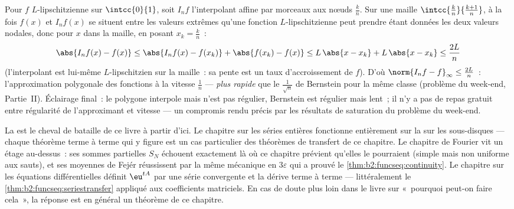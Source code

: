 \begin{example}\label{ex:b2:funcseq:polygonal}
Pour $f$ $L$-lipschitzienne sur $\intcc{0}{1}$, soit $I_nf$
l'interpolant affine par morceaux aux nœuds $\frac kn$. Sur une
maille $\intcc{\frac kn}{\frac{k+1}n}$, à la fois $f(x)$ et
$I_nf(x)$ se situent entre les valeurs extrêmes qu'une fonction
$L$-lipschitzienne peut prendre étant données les deux valeurs
nodales, donc pour $x$ dans la maille, en posant $x_k = \frac kn$~:
\[
\abs{I_nf(x) - f(x)}
\leq \abs{I_nf(x) - f(x_k)} + \abs{f(x_k) - f(x)}
\leq L\,\abs{x - x_k} + L\,\abs{x - x_k}
\leq \frac{2L}{n}
\]
(l'interpolant est lui-même $L$-lipschitzien sur la maille~: sa
pente est un taux d'accroissement de $f$). D'où $\norm{I_nf -
f}_\infty \leq \frac{2L}{n}$~: l'approximation polygonale des
fonctions   à la vitesse $\frac1n$ ---
\emph{plus rapide} que le $\frac{1}{\sqrt n}$ de Bernstein pour la
même classe (problème du week-end, Partie~II). Éclairage final~: le
polygone interpole mais n'est pas régulier, Bernstein est régulier
mais lent~; il n'y a pas de repas gratuit entre régularité de
l'approximant et vitesse --- un compromis rendu précis par les
résultats de saturation du problème du week-end.
\end{example}

\begin{remark}
La  est le cheval de bataille de ce livre à partir
d'ici. Le chapitre sur les séries entières fonctionne entièrement sur
la  sur les sous-disques  --- chaque
théorème terme à terme qui y figure est un cas particulier des
théorèmes de transfert de ce chapitre. Le chapitre de Fourier vit un
étage au-dessus~: ses sommes partielles $S_N$ échouent exactement là
où ce chapitre prévient qu'elles le pourraient (simple mais non
uniforme aux sauts), et ses moyennes de Fejér réussissent par la même
mécanique en $3\varepsilon$ qui a prouvé le
\cref{thm:b2:funcseq:continuity}. Le chapitre sur les équations
différentielles définit $\eu^{tA}$ par une série 
convergente et la dérive terme à terme --- littéralement le
\cref{thm:b2:funcseq:seriestransfer} appliqué aux coefficients
matriciels. En cas de doute plus loin dans le livre sur «~pourquoi
peut-on faire cela~», la réponse est en général un théorème de ce
chapitre.
\end{remark}

